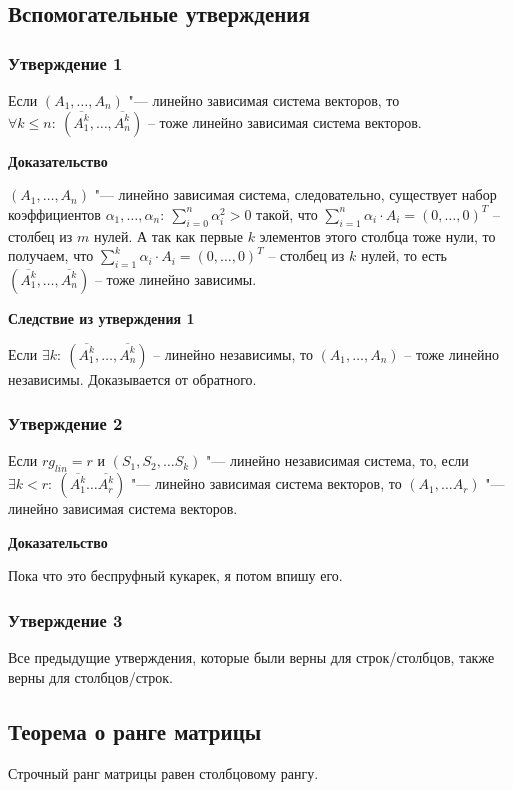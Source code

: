 \documentclass{article}
\begin{document}
\subsection{Вспомогательные утверждения}
\subsubsection{Утверждение 1}
Если $(A_1,\ldots,A_n)$ "--- линейно зависимая система векторов, то $\forall k \leq n:\:(\overline{A^k_1},\ldots,\overline{A^k_n})$ -- тоже линейно зависимая система векторов.

\textbf{Доказательство}

$(A_1,\ldots,A_n)$ "--- линейно зависимая система, следовательно, существует набор коэффициентов $\alpha_1,\ldots,\alpha_n:\: \sum\limits_{i = 0}^n \alpha_i^2 > 0$ такой, что $\sum\limits_{i=1}^n \alpha_i\cdot A_i = (0,\ldots,0)^T$ -- столбец из $m$ нулей. А так как первые $k$ элементов этого столбца тоже нули, то получаем, что $\sum\limits_{i=1}^k \alpha_i\cdot A_i=(0,\ldots,0)^T$ -- столбец из $k$ нулей, то есть $(\overline{A_1^k},\ldots,\overline{A^k_n})$ -- тоже линейно зависимы.

\textbf{Следствие из утверждения 1}

Если $\exists k:\: (\overline{A_1^k},\ldots,\overline{A^k_n})$ -- линейно независимы, то $(A_1,\ldots,A_n)$ -- тоже линейно независимы. Доказывается от обратного.

\subsubsection{Утверждение 2}
Если $rg_{lin} = r$ и $(S_1, S_2, \ldots S_k)$ "--- линейно независимая система, то, если $\exists k < r:\:(\overline{A^k_1}\ldots \overline{A^k_r})$ "--- линейно зависимая система векторов, то $(A_1, \ldots A_r)$ "--- линейно зависимая система векторов.

\textbf{Доказательство}

Пока что это беспруфный кукарек, я потом впишу его.

\subsubsection{Утверждение 3}
Все предыдущие утверждения, которые были верны для строк/столбцов, также верны для столбцов/строк.

\subsection{Теорема о ранге матрицы}
Строчный ранг матрицы равен столбцовому рангу.
\end{document}
